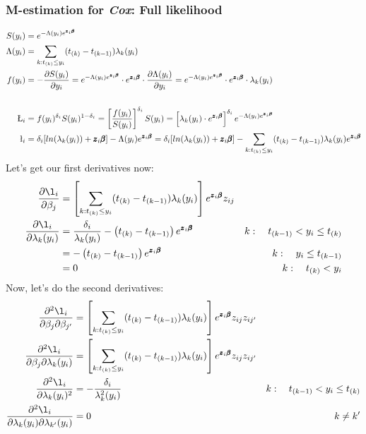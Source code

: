 \documentclass[]{article}
\begin{document}
\subsubsection{M-estimation for \emph{Cox}: Full likelihood}
$$
  \begin{aligned}
    S(y_i) &=  e^{-\Lambda(y_i) e^{\pmb{z}_i\pmb{\beta}}} \\
    \Lambda(y_i)  &= \sum_{k: t_{(k)}\leq y_i} (t_{(k)} - t_{(k-1)}) \lambda_k(y_i)\\
    f(y_i) &= -\frac{\partial S(y_i)}{\partial y_i} =   e^{-\Lambda(y_i) e^{\pmb{z}_i\pmb{\beta}}} \cdot e^{\pmb{z}_i\pmb{\beta}} \cdot \frac{\partial \Lambda(y_i)}{\partial y_i} =   e^{-\Lambda(y_i) e^{\pmb{z}_i\pmb{\beta}}} \cdot e^{\pmb{z}_i\pmb{\beta}} \cdot \lambda_k(y_i) \\\\
    \L_i  &= f(y_i)^{\delta_i} S(y_i)^{1 - \delta_i} = \left[  \frac{f(y_i)}{S(y_i)}  \right]^{\delta_i}   S(y_i) = \left[   \lambda_k(y_i) \cdot e^{\pmb{z}_i\pmb{\beta}}   \right]^{\delta_i} e^{-\Lambda(y_i) e^{\pmb{z}_i\pmb{\beta}}}\\
    \l_i  &= \delta_i [ln(\lambda_k(y_i)) + \pmb{z}_i\pmb{\beta}] -\Lambda(y_i) e^{\pmb{z}_i\pmb{\beta}} = \delta_i [ln(\lambda_k(y_i)) + \pmb{z}_i\pmb{\beta}] -\sum_{k: t_{(k)}\leq y_i} (t_{(k)} - t_{(k-1)}) \lambda_k(y_i) e^{\pmb{z}_i\pmb{\beta}}\\
  \end{aligned}
  $$
Let's get our first derivatives now:
$$
  \begin{aligned}
   \frac{\partial \l_i}{\partial \beta_j}  &= \left[  \sum_{k: t_{(k)}\leq y_i} (t_{(k)} - t_{(k-1)}) \lambda_k(y_i)   \right]  e^{\pmb{z}_i\pmb{\beta}} z_{ij}\\
    \frac{\partial \l_i}{\partial \lambda_k(y_i)}  &= \frac{\delta_i}{\lambda_k(y_i)} -  \left(  t_{(k)} - t_{(k-1)}  \right) e^{\pmb{z}_i\pmb{\beta}}~~~~  &k:~~~t_{(k - 1)} < y_i \leq t_{(k)}\\
      &= -  \left(  t_{(k)} - t_{(k-1)}  \right) e^{\pmb{z}_i\pmb{\beta}}~~~~  &k:~~~y_i \leq t_{(k-1)}\\
      &= 0 ~~~~  &k:~~~t_{(k)} < y_i\\
  \end{aligned}
$$
Now, let's do the second derivatives:
$$
  \begin{aligned}
   \frac{\partial^2 \l_i}{\partial \beta_j \partial \beta_{j'}}  &= \left[  \sum_{k: t_{(k)}\leq y_i} (t_{(k)} - t_{(k-1)}) \lambda_k(y_i)   \right]  e^{\pmb{z}_i\pmb{\beta}} z_{ij} z_{ij'}\\
   \frac{\partial^2 \l_i}{\partial \beta_j \partial \lambda_k(y_i)}  &= \left[  \sum_{k: t_{(k)}\leq y_i} (t_{(k)} - t_{(k-1)}) \lambda_k(y_i)   \right]  e^{\pmb{z}_i\pmb{\beta}} z_{ij} z_{ij'}\\
    \frac{\partial^2 \l_i}{\partial \lambda_k(y_i)^2}  &= -\frac{\delta_i}{\lambda_k^2(y_i)} ~~~~  &k:~~~t_{(k - 1)} < y_i \leq t_{(k)}\\
    \frac{\partial^2 \l_i}{\partial \lambda_k(y_i)\partial \lambda_{k'}(y_i)}  &= 0~~~~  &~~~k \neq k'\\
  \end{aligned}
$$
\end{document}
